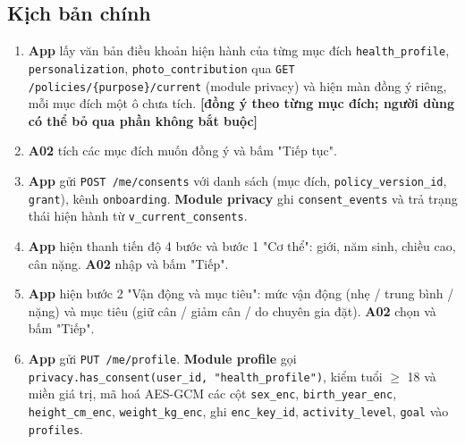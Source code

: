\subsection{Kịch bản chính}
\begin{enumerate}
\item \textbf{App} lấy văn bản điều khoản hiện hành của từng mục đích {\small\texttt{health\_\allowbreak{}\allowbreak{}profile}}, {\small\texttt{personalization}}, {\small\texttt{photo\_\allowbreak{}\allowbreak{}contribution}} qua {\small\texttt{GET /\allowbreak{}\allowbreak{}policies/\allowbreak{}\allowbreak{}\{purpose\}/\allowbreak{}\allowbreak{}current}} (module privacy) và hiện màn đồng ý riêng, mỗi mục đích một ô chưa tích. \textbf{[đồng ý theo từng mục đích; người dùng có thể bỏ qua phần không bắt buộc]}
\item \textbf{A02} tích các mục đích muốn đồng ý và bấm "Tiếp tục".
\item \textbf{App} gửi {\small\texttt{POST /\allowbreak{}\allowbreak{}me/\allowbreak{}\allowbreak{}consents}} với danh sách (mục đích, {\small\texttt{policy\_\allowbreak{}\allowbreak{}version\_\allowbreak{}\allowbreak{}id}}, {\small\texttt{grant}}), kênh {\small\texttt{onboarding}}. \textbf{Module privacy} ghi {\small\texttt{consent\_\allowbreak{}\allowbreak{}events}} và trả trạng thái hiện hành từ {\small\texttt{v\_\allowbreak{}\allowbreak{}current\_\allowbreak{}\allowbreak{}consents}}.
\item \textbf{App} hiện thanh tiến độ 4 bước và bước 1 "Cơ thể": giới, năm sinh, chiều cao, cân nặng. \textbf{A02} nhập và bấm "Tiếp".
\item \textbf{App} hiện bước 2 "Vận động và mục tiêu": mức vận động (nhẹ /\allowbreak{} trung bình /\allowbreak{} nặng) và mục tiêu (giữ cân /\allowbreak{} giảm cân /\allowbreak{} do chuyên gia đặt). \textbf{A02} chọn và bấm "Tiếp".
\item \textbf{App} gửi {\small\texttt{PUT /\allowbreak{}\allowbreak{}me/\allowbreak{}\allowbreak{}profile}}. \textbf{Module profile} gọi {\small\texttt{privacy.\allowbreak{}has\_\allowbreak{}\allowbreak{}consent(user\_\allowbreak{}\allowbreak{}id, "health\_\allowbreak{}\allowbreak{}profile")}}, kiểm tuổi \ensuremath{\geq} 18 và miền giá trị, mã hoá AES-\allowbreak{}GCM các cột {\small\texttt{sex\_\allowbreak{}\allowbreak{}enc}}, {\small\texttt{birth\_\allowbreak{}\allowbreak{}year\_\allowbreak{}\allowbreak{}enc}}, {\small\texttt{height\_\allowbreak{}\allowbreak{}cm\_\allowbreak{}\allowbreak{}enc}}, {\small\texttt{weight\_\allowbreak{}\allowbreak{}kg\_\allowbreak{}\allowbreak{}enc}}, ghi {\small\texttt{enc\_\allowbreak{}\allowbreak{}key\_\allowbreak{}\allowbreak{}id}}, {\small\texttt{activity\_\allowbreak{}\allowbreak{}level}}, {\small\texttt{goal}} vào {\small\texttt{profiles}}.

\end{enumerate}
